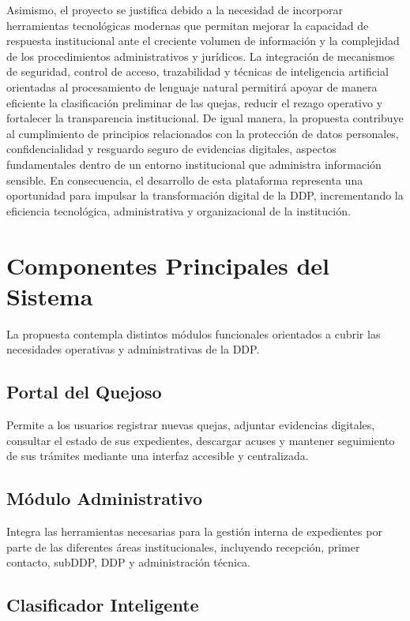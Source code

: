 Asimismo, el proyecto se justifica debido a la necesidad de incorporar herramientas tecnológicas modernas que permitan mejorar la capacidad de respuesta institucional ante el creciente volumen de información y la complejidad de los procedimientos administrativos y jurídicos. La integración de mecanismos de seguridad, control de acceso, trazabilidad y técnicas de inteligencia artificial orientadas al procesamiento de lenguaje natural permitirá apoyar de manera eficiente la clasificación preliminar de las quejas, reducir el rezago operativo y fortalecer la transparencia institucional. De igual manera, la propuesta contribuye al cumplimiento de principios relacionados con la protección de datos personales, confidencialidad y resguardo seguro de evidencias digitales, aspectos fundamentales dentro de un entorno institucional que administra información sensible. En consecuencia, el desarrollo de esta plataforma representa una oportunidad para impulsar la transformación digital de la DDP, incrementando la eficiencia tecnológica, administrativa y organizacional de la institución.

\section{Componentes Principales del Sistema}

La propuesta contempla distintos módulos funcionales orientados a cubrir las necesidades operativas y administrativas de la DDP.

\subsection{Portal del Quejoso}

Permite a los usuarios registrar nuevas quejas, adjuntar evidencias digitales, consultar el estado de sus expedientes, descargar acuses y mantener seguimiento de sus trámites mediante una interfaz accesible y centralizada.

\subsection{Módulo Administrativo}

Integra las herramientas necesarias para la gestión interna de expedientes por parte de las diferentes áreas institucionales, incluyendo recepción, primer contacto, subDDP, DDP y administración técnica.

\subsection{Clasificador Inteligente}

